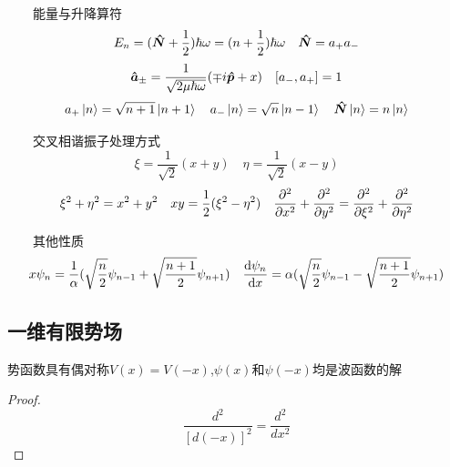 \documentclass{article}
\begin{document}
\begin{formal}
\begin{enumerate}
                $\qquad$能量与升降算符
                $$ E_{n} = (\vu*{N} + \frac{1}{2}) \hbar \omega = (n + \frac{1}{2}) \hbar \omega   \quad  \vu*{N} = a_{+} a_{-}   $$
                $$ \vu*{a}_{\pm} = \frac{1}{\sqrt{2\mu \hbar \omega}} (\mp i\vu*{p} + x) \quad \comm{\da}{\ua} = 1 $$
                $$ a_{+} \ket{n} = \sqrt{n+1}\ket{n+1} \quad a_{-}\ket{n} = \sqrt{n}\ket{n-1} \quad \vu*{N}\ket{n} = n \ket{n}$$
                
                $\qquad$交叉相谐振子处理方式
                $$ \xi = \frac{1}{\sqrt{2}} (x+y) \quad \eta = \frac{1}{\sqrt{2}} (x -y)  $$
                $$ \xi^{2} + \eta^{2} = x^{2} + y^{2} \quad xy = \frac{1}{2} (\xi^{2} - \eta^{2}) \quad \pdv[2]{x} + \pdv[2]{y} = \pdv[2]{\xi} + \pdv[2]{\eta}$$
                
                $\qquad$其他性质
                $$  
                x \psi_{n} = \frac{1}{\alpha}(\sqrt{\frac{n}{2}}\psi_{n-1} + \sqrt{\frac{n+1}{2}} \psi_{n+1})  \quad 
                \dv{\psi_{n}}{x} = \alpha (\sqrt{\frac{n}{2}}\psi_{n-1} - \sqrt{\frac{n+1}{2}} \psi_{n+1}) 
                $$



                
                

                
            \end{enumerate}
        \end{formal}

        \subsection{一维有限势场}
        \begin{thm}\label{thm:1.1}                                                %
            势函数具有偶对称$V(x)=V(-x)$,$\psi(x)$和$\psi(-x)$均是波函数的解
            
            \begin{proof}
                
                $$ \frac{d^2}{[d(-x)]^2}=\frac{d^2}{dx^2} $$ 

            \end{proof}
        
        \end{thm}
    
\end{document}

